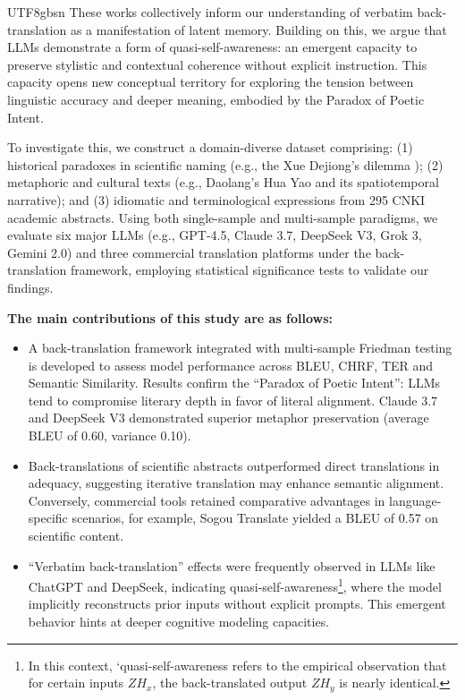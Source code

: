 \documentclass[conference]{IEEEtran}
\begin{document}
\begin{CJK}{UTF8}{gbsn}
These works collectively inform our understanding of verbatim back-translation as a manifestation of latent memory. Building on this, we argue that LLMs demonstrate a form of quasi-self-awareness: an emergent capacity to preserve stylistic and contextual coherence without explicit instruction. This capacity opens new conceptual territory for exploring the tension between linguistic accuracy and deeper meaning, embodied by the Paradox of Poetic Intent.

To investigate this, we construct a domain-diverse dataset comprising: (1) historical paradoxes in scientific naming (e.g., the Xue Dejiong’s dilemma \citep{hejuan2019nomencl,weigang2025xdj}); (2) metaphoric and cultural texts (e.g., Daolang’s Hua Yao and its spatiotemporal narrative); and (3) idiomatic and terminological expressions from 295 CNKI academic abstracts. Using both single-sample and multi-sample paradigms, we evaluate six major LLMs (e.g., GPT-4.5, Claude 3.7, DeepSeek V3, Grok 3, Gemini 2.0) and three commercial translation platforms under the back-translation framework, employing statistical significance tests to validate our findings.

\textbf{The main contributions of this study are as follows:}
\begin{itemize}
\item A back-translation framework integrated with multi-sample Friedman testing is developed to assess model performance across BLEU, CHRF, TER and Semantic Similarity. Results confirm the ``Paradox of Poetic Intent'': LLMs tend to compromise literary depth in favor of literal alignment. Claude 3.7 and DeepSeek V3 demonstrated superior metaphor preservation (average BLEU of 0.60, variance 0.10).

\item Back-translations of scientific abstracts outperformed direct translations in adequacy, suggesting iterative translation may enhance semantic alignment. Conversely, commercial tools retained comparative advantages in language-specific scenarios, for example, Sogou Translate yielded a BLEU of 0.57 on scientific content.

\item ``Verbatim back-translation'' effects were frequently observed in LLMs like ChatGPT and DeepSeek, indicating quasi-self-awareness\footnote{In this context, `quasi-self-awareness refers to the empirical observation that for certain inputs \(ZH_x\), the back-translated output \(ZH_y\) is nearly identical.}, where the model implicitly reconstructs prior inputs without explicit prompts. This emergent behavior hints at deeper cognitive modeling capacities.


\end{itemize}
\end{CJK}
\end{document}

